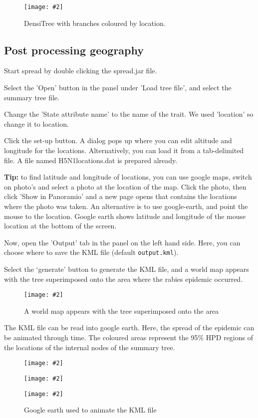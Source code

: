 \documentclass{article}
\newcommand{\includeimage}[2][]{%
\texttt{[image: \#2]}
}
\begin{document}
\begin{figure}
\centering
\includeimage[scale=0.4]{figures/DensiTree2.pdf}
\caption{DensiTree with branches coloured by location.}
\label{fig.DensiTree2} 
\end{figure}

\subsection*{Post processing geography}

Start spread by double clicking the spread.jar file.

Select the 'Open' button in the panel under 'Load tree file', and select the summary tree file.

Change the 'State attribute name' to the name of the trait. We used 'location' so change it to location.

Click the set-up button. A dialog pops up where you can edit altitude and longitude for the locations. 
Alternatively, you can load it from a tab-delimited file. A file named H5N1locations.dat is prepared already.

{\bf Tip:} to find latitude and longitude of locations, you can 
use google maps, switch on photo's and select a photo at the location 
of the map. Click the photo, then click 'Show in Panoramio' and a 
new page opens that contains the locations where the photo was taken.
An alternative is to use google-earth, and point the mouse to the 
location. Google earth shows latitude and longitude of the mouse 
location at the bottom of the screen.

Now, open the 'Output' tab in the panel on the left hand side. Here, you can choose where to save the KML file (default {\tt output.kml}).

Select the `generate' button to generate the KML file, and a world map appears with the tree superimposed onto the area where the rabies epidemic occurred.

\begin{figure}
\centering
\includeimage[scale=0.3]{figures/spread}
\caption{A world map appears with the tree superimposed onto the area}
\label{fig.DensiTree2} 
\end{figure}

The KML file can be read into google earth. Here, the spread of the epidemic can be animated through time. The coloured areas represent the 95\% HPD regions of the locations of the internal nodes of the summary tree.

\begin{figure}
\centering
\includeimage[scale=0.2]{figures/google-earth0}
\includeimage[scale=0.2]{figures/google-earth1}
\includeimage[scale=0.4]{figures/google-earth2}
\caption{Google earth used to animate the KML file}
\label{fig.ge}
\end{figure}



\end{document}
